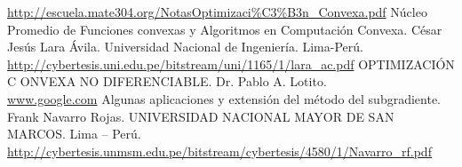 \begin{thebibliography}{99}
		\url{http://escuela.mate304.org/NotasOptimizaci\%C3\%B3n_Convexa.pdf}
 N\'ucleo Promedio de Funciones convexas y Algoritmos en Computaci\'on Convexa. C\'esar Jes\'us Lara \'Avila. Universidad Nacional de 
	       Ingenier\'ia. Lima-Per\'u.\\
	       \url{http://cybertesis.uni.edu.pe/bitstream/uni/1165/1/lara_ac.pdf}
 OPTIMIZACI\'ON C ONVEXA NO DIFERENCIABLE. Dr. Pablo A. Lotito.\\
		\url{www.google.com}
 Algunas aplicaciones y extensi\'on del m\'etodo del subgradiente. Frank Navarro Rojas. UNIVERSIDAD NACIONAL MAYOR DE SAN
		  MARCOS. Lima – Perú.\\
		  \url{http://cybertesis.unmsm.edu.pe/bitstream/cybertesis/4580/1/Navarro_rf.pdf}
  \end{thebibliography}
% 
% 
% 
% 


